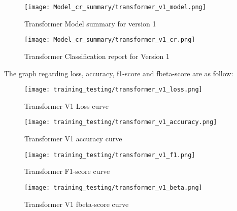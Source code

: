 \begin{figure}[H]
    \centering
    \texttt{[image: Model\_cr\_summary/transformer\_v1\_model.png]}
    \caption{Transformer Model summary for version 1}
    \label{fig:Transformer Model summary for version 1}
\end{figure}

\begin{figure}[H]
    \centering
    \texttt{[image: Model\_cr\_summary/transformer\_v1\_cr.png]}
    \caption{Transformer Classification report for Version 1}
    \label{fig:Transformer Classification report for Version 1}
\end{figure}

The graph regarding loss, accuracy, f1-score and fbeta-score are as follow:

\begin{figure}[H]
    \centering
    \texttt{[image: training\_testing/transformer\_v1\_loss.png]}
    \caption{Transformer V1 Loss curve}
    \label{fig:Transformer V1 loss curve}
\end{figure}

\begin{figure}[H]
    \centering
    \texttt{[image: training\_testing/transformer\_v1\_accuracy.png]}
    \caption{Transformer V1 accuracy curve}
    \label{fig:Transformer V1 accuracy curve}
\end{figure}

\begin{figure}[H]
    \centering
    \texttt{[image: training\_testing/transformer\_v1\_f1.png]}
    \caption{Transformer F1-score curve}
    \label{fig:Transformer F1-score curve}
\end{figure}

\begin{figure}[H]
    \centering
    \texttt{[image: training\_testing/transformer\_v1\_beta.png]}
    \caption{Transformer V1 fbeta-score curve}
    \label{fig:Transformer V1 fbeta-score curve}
\end{figure}

